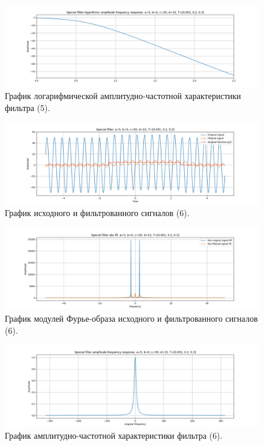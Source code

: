 \documentclass[a4paper, 12pt]{article}
\begin{document}
    \begin{figure}[H]
        \centering
        \includegraphics[scale=0.4]{5_fl2_lafr.png}
        \captionsetup{skip=0pt}
        \caption{График логарифмической амплитудно-частотной характеристики фильтра (5).}
        \label{fig:filinlafr25}
    \end{figure}
    \begin{figure}[H]
        \centering
        \includegraphics[scale=0.4]{6_fl2.png}
        \captionsetup{skip=0pt}
        \caption{График исходного и фильтрованного сигналов (6).}
        \label{fig:filin26}
    \end{figure}
    \begin{figure}[H]
        \centering
        \includegraphics[scale=0.4]{6_fl2_abs.png}
        \captionsetup{skip=0pt}
        \caption{График модулей Фурье-образа исходного и фильтрованного сигналов (6).}
        \label{fig:filinabs26}
    \end{figure}
    \begin{figure}[H]
        \centering
        \includegraphics[scale=0.4]{6_fl2_afr.png}
        \captionsetup{skip=0pt}
        \caption{График амплитудно-частотной характеристики фильтра (6).}
        \label{fig:filinafr26}
    \end{figure}
\end{document}
